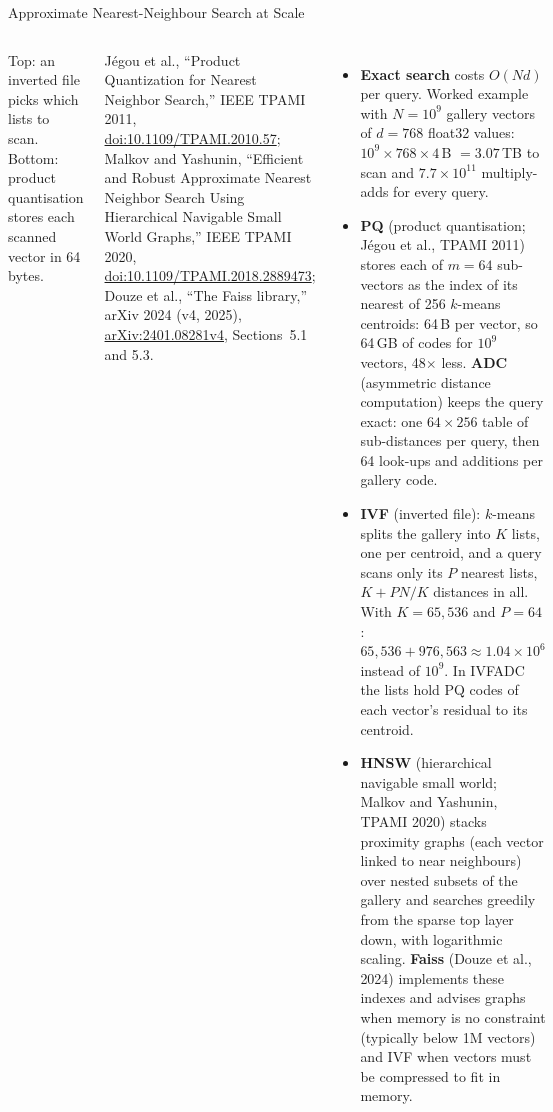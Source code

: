\begin{frame}{Approximate Nearest-Neighbour Search at Scale}
\begin{columns}[T,onlytextwidth]
      {\scriptsize Top: an inverted file picks which lists to scan. Bottom: product quantisation stores each scanned vector in 64 bytes.\par}
      \vspace{0.5em}
      {\scriptsize J\'egou et al., ``Product Quantization for Nearest Neighbor Search,'' IEEE TPAMI 2011, \href{https://doi.org/10.1109/TPAMI.2010.57}{doi:10.1109/TPAMI.2010.57}; Malkov and Yashunin, ``Efficient and Robust Approximate Nearest Neighbor Search Using Hierarchical Navigable Small World Graphs,'' IEEE TPAMI 2020, \href{https://doi.org/10.1109/TPAMI.2018.2889473}{doi:10.1109/TPAMI.2018.2889473}; Douze et al., ``The Faiss library,'' arXiv 2024 (v4, 2025), \href{https://arxiv.org/abs/2401.08281v4}{arXiv:2401.08281v4}, Sections~5.1 and 5.3.\par}
      \begin{itemize}\scriptsize\itemsep0.35em
        \item \textbf{Exact search} costs $O(Nd)$ per query. Worked example with $N = 10^{9}$ gallery vectors of $d = 768$ float32 values: $10^{9} \times 768 \times 4$\,B $= 3.07$\,TB to scan and $7.7 \times 10^{11}$ multiply-adds for every query.
        \item \textbf{PQ} (product quantisation; J\'egou et al., TPAMI 2011) stores each of $m = 64$ sub-vectors as the index of its nearest of 256 $k$-means centroids: 64\,B per vector, so 64\,GB of codes for $10^{9}$ vectors, 48$\times$ less. \textbf{ADC} (asymmetric distance computation) keeps the query exact: one $64 \times 256$ table of sub-distances per query, then 64 look-ups and additions per gallery code.
        \item \textbf{IVF} (inverted file): $k$-means splits the gallery into $K$ lists, one per centroid, and a query scans only its $P$ nearest lists, $K + PN/K$ distances in all. With $K = 65{,}536$ and $P = 64$: $65{,}536 + 976{,}563 \approx 1.04 \times 10^{6}$ instead of $10^{9}$. In IVFADC the lists hold PQ codes of each vector's residual to its centroid.
        \item \textbf{HNSW} (hierarchical navigable small world; Malkov and Yashunin, TPAMI 2020) stacks proximity graphs (each vector linked to near neighbours) over nested subsets of the gallery and searches greedily from the sparse top layer down, with logarithmic scaling. \textbf{Faiss} (Douze et al., 2024) implements these indexes and advises graphs when memory is no constraint (typically below 1M vectors) and IVF when vectors must be compressed to fit in memory.
      \end{itemize}
  \end{columns}
\end{frame}
